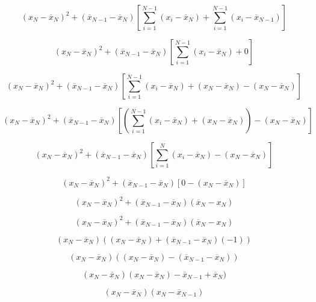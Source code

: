 \documentclass{article}
\newcommand*\mean[1]{\overline{#1}}
\begin{document}
\begin{equation}
     (x_N - \mean{x}_N)^2 + (\mean{x}_{N-1} - \mean{x}_N)[\sum_{i=1}^{N-1} (x_i - \mean{x}_N) + \sum_{i=1}^{N-1}(x_i - \mean{x}_{N-1})]
\end{equation}

\begin{equation}
     (x_N - \mean{x}_N)^2 + (\mean{x}_{N-1} - \mean{x}_N)[\sum_{i=1}^{N-1} (x_i - \mean{x}_N) + 0]
\end{equation}

\begin{equation}
     (x_N - \mean{x}_N)^2 + (\mean{x}_{N-1} - \mean{x}_N)[\sum_{i=1}^{N-1} (x_i - \mean{x}_N) + (x_N - \mean{x}_N) - (x_N - \mean{x}_N)]
\end{equation}

\begin{equation}
     (x_N - \mean{x}_N)^2 + (\mean{x}_{N-1} - \mean{x}_N)[(\sum_{i=1}^{N-1} (x_i - \mean{x}_N) + (x_N - \mean{x}_N)) - (x_N - \mean{x}_N)]
\end{equation}


\begin{equation}
     (x_N - \mean{x}_N)^2 + (\mean{x}_{N-1} - \mean{x}_N)[\sum_{i=1}^{N} (x_i - \mean{x}_N) - (x_N - \mean{x}_N)]
\end{equation}


\begin{equation}
     (x_N - \mean{x}_N)^2 + (\mean{x}_{N-1} - \mean{x}_N)[0 - (x_N - \mean{x}_N)]
\end{equation}

\begin{equation}
     (x_N - \mean{x}_N)^2 + (\mean{x}_{N-1} - \mean{x}_N)(\mean{x}_N - x_N)
\end{equation}

\begin{equation}
     (x_N - \mean{x}_N)^2 + (\mean{x}_{N-1} - \mean{x}_N)(\mean{x}_N - x_N)
\end{equation}

\begin{equation}
    (x_N - \mean{x}_N) ((x_N - \mean{x}_N) + (\mean{x}_{N-1} - \mean{x}_N)(-1))
\end{equation}

\begin{equation}
    (x_N - \mean{x}_N) ((x_N - \mean{x}_N) - (\mean{x}_{N-1} - \mean{x}_N))
\end{equation}

\begin{equation}
    (x_N - \mean{x}_N) (x_N - \mean{x}_N)- \mean{x}_{N-1} + \mean{x}_N)
\end{equation}

\begin{equation}
    (x_N - \mean{x}_N) (x_N - \mean{x}_{N-1})
\end{equation}
\end{document}
